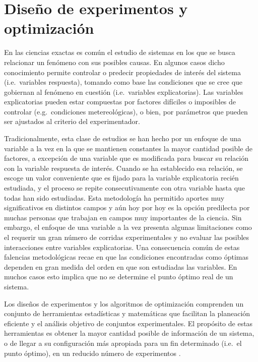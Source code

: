 \section{Diseño de experimentos y optimización}\label{sec:DoE}
En las ciencias exactas es común el estudio de sistemas en los que se busca relacionar un fenómeno con sus posibles causas. En algunos casos dicho conocimiento permite controlar o predecir propiedades de interés del sistema (i.e.\ variables respuesta), tomando como base las condiciones que se cree que gobiernan al fenómeno en cuestión (i.e.\ variables explicatorias). Las variables explicatorias pueden estar compuestas por factores difíciles o imposibles de controlar (e.g.\ condiciones metereo\-lógicas), o bien, por parámetros que pueden ser ajustados al criterio del experimentador.

Tradicionalmente, esta clase de estudios se han hecho por un enfoque de una variable a la vez en la que se mantienen constantes la mayor cantidad posible de factores, a excepción de una variable que es modificada para buscar su relación con la variable respuesta de interés. Cuando se ha establecido esa relación, se escoge un valor conveniente que es fijado para la variable explicatoria recién estudiada, y el proceso se repite consecutivamente con otra variable hasta que todas han sido estudiadas. Esta metodología ha permitido aportes muy significativos en distintos campos y aún hoy por hoy es la opción predilecta por muchas personas que trabajan en campos muy importantes de la ciencia. Sin embargo, el enfoque de una variable a la vez presenta algunas limitaciones como el requerir un gran número de corridas experimentales y no evaluar las posibles interacciones entre variables explicatorias. Una consecuencia común de estas falencias metodológicas recae en que las condiciones encontradas como {óptimas} dependen en gran medida del orden en que son estudiadas las variables. En muchos casos esto implica que no se determine el punto óptimo real de un sistema.

Los diseños de experimentos y los algoritmos de optimización comprenden un conjunto de herramientas estadísticas y matemáticas que facilitan la planeación eficiente y el análisis objetivo de conjuntos experimentales. El propósito de estas herramientas es obtener la mayor cantidad posible de información de un sistema, o de llegar a su configuración más apropiada para un fin determinado (i.e.\ el punto óptimo), en un reducido número de experimentos \citep{Box2005}. 


